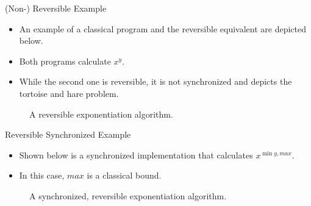 \begin{frame}{(Non-) Reversible Example}
    \begin{itemize}
        \item An example of a classical program and the reversible equivalent are depicted below.
        \item Both programs calculate $x^y$. 
        \item While the second one is reversible, it is not synchronized and depicts the tortoise and hare problem.
    \end{itemize}
    \begin{figure}[htp]
        \centering     
        \begin{minipage}{.40\textwidth}
            
            \caption{A non-reversible exponentiation algorithm.}
            \label{fig:qcm_not_reverse}
        \end{minipage}
        \hfill
        \begin{minipage}{.50\textwidth}
            
            \caption{A reversible exponentiation algorithm.}    
            \label{fig:qcm_reverse}
        \end{minipage}
    \end{figure}
\end{frame}

\begin{frame}{Reversible Synchronized Example}
    \begin{itemize}
        \item Shown below is a synchronized implementation that calculates $x^{\min{y, max}}$.
        \item In this case, $max$ is a classical bound.
    \end{itemize}
    \begin{figure}[htp]
        \centering     
        
        \caption{A synchronized, reversible exponentiation algorithm.}
        \label{fig:qcm_sync}
    \end{figure}
\end{frame}